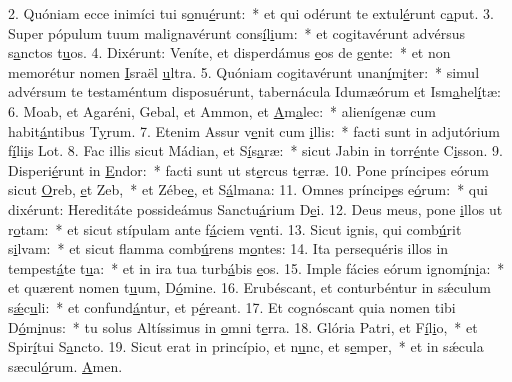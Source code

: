 2. Quóniam ecce inimíci tui s\uline{o}nu\uline{é}runt:~* et qui odérunt te extul\uline{é}runt c\uline{a}put.
3. Super pópulum tuum malignavérunt cons\uline{í}l\uline{i}um:~* et cogitavérunt advérsus s\uline{a}nctos t\uline{u}os.
4. Dixérunt: Veníte, et disperdámus \uline{e}os de g\uline{e}nte:~* et non memorétur nomen \uline{I}sraël \uline{u}ltra.
5. Quóniam cogitavérunt unan\uline{í}m\uline{i}ter:~* simul advérsum te testaméntum disposuérunt, tabernácula Idumæórum et Ism\uline{a}hel\uline{í}tæ:
6. Moab, et Agaréni, Gebal, et Ammon, et \uline{A}m\uline{a}lec:~* alienígenæ cum habit\uline{á}ntibus T\uline{y}rum.
7. Etenim Assur v\uline{e}nit cum \uline{i}llis:~* facti sunt in adjutórium f\uline{í}li\uline{i}s Lot.
8. Fac illis sicut Mádian, et S\uline{í}s\uline{a}ræ:~* sicut Jabin in torr\uline{é}nte C\uline{i}sson.
9. Disperi\uline{é}runt in \uline{E}ndor:~* facti sunt ut st\uline{e}rcus t\uline{e}rræ.
10. Pone príncipes eórum sicut \uline{O}reb, \uline{e}t Zeb,~* et Zébe\uline{e}, et S\uline{á}lmana:
11. Omnes príncip\uline{e}s e\uline{ó}rum:~* qui dixérunt: Hereditáte possideámus Sanctu\uline{á}rium D\uline{e}i.
12. Deus meus, pone \uline{i}llos ut r\uline{o}tam:~* et sicut stípulam ante f\uline{á}ciem v\uline{e}nti.
13. Sicut ignis, qui comb\uline{ú}rit s\uline{i}lvam:~* et sicut flamma comb\uline{ú}rens m\uline{o}ntes:
14. Ita persequéris illos in tempest\uline{á}te t\uline{u}a:~* et in ira tua turb\uline{á}bis \uline{e}os.
15. Imple fácies eórum ignom\uline{í}n\uline{i}a:~* et quærent nomen t\uline{u}um, D\uline{ó}mine.
16. Erubéscant, et conturbéntur in sǽculum s\uline{ǽ}c\uline{u}li:~* et confund\uline{á}ntur, et p\uline{é}reant.
17. Et cognóscant quia nomen tibi D\uline{ó}m\uline{i}nus:~* tu solus Altíssimus in \uline{o}mni t\uline{e}rra.
18. Glória Patri, et F\uline{í}l\uline{i}o,~* et Spir\uline{í}tui S\uline{a}ncto.
19. Sicut erat in princípio, et n\uline{u}nc, et s\uline{e}mper,~* et in sǽcula sæcul\uline{ó}rum. \uline{A}men.
